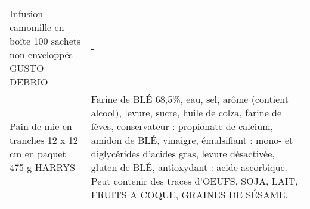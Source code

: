 \begin{longtable}{p{5cm}p{10cm}}
                                      Infusion camomille en boîte 100 sachets non enveloppés GUSTO DEBRIO &                                                                                                                                                                                                                                                                                                                                                                                                                                                                                                                                                                                                                                                                                                                                                                                                                                                                                                                                                                                                                                        - \\
                                                Pain de mie en tranches 12 x 12 cm en paquet 475 g HARRYS &                                                                                                                                                                                                                                                                                                                                                                                                                                                                                                                                                                                                                                                             Farine de BLÉ 68,5\%, eau, sel, arôme (contient alcool), levure, sucre, huile de colza, farine de fèves, conservateur : propionate de calcium, amidon de BLÉ, vinaigre, émulsifiant : mono- et diglycérides d'acides gras, levure désactivée, gluten de BLÉ, antioxydant : acide ascorbique. Peut contenir des traces d'OEUFS, SOJA, LAIT, FRUITS A COQUE, GRAINES DE SÉSAME. \\

\end{longtable}
